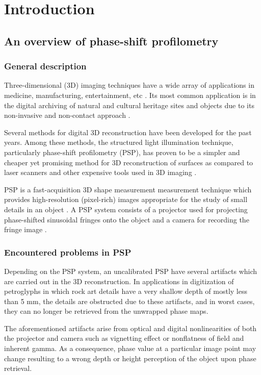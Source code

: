 \chapter{Introduction}

\section{An overview of phase-shift profilometry}
\subsection{General description}

Three-dimensional (3D) imaging techniques have a wide array of applications in medicine, manufacturing, entertainment, etc \cite{}. 
Its most common application is in the digital archiving of natural and cultural heritage sites and objects due to its non-invasive and non-contact approach \cite{Simon2013}. 

Several methods for digital 3D reconstruction have been developed for the past years. Among these methods, the structured light illumination technique, particularly phase-shift profilometry (PSP), has proven to be a simpler and cheaper yet promising method for 3D reconstruction of surfaces as compared to laser scanners and other expensive tools used in 3D imaging \cite{Zhang2002, Chrova200x}. 

PSP is a fast-acquisition 3D shape measurement measurement technique which provides high-resolution (pixel-rich) images appropriate for the study of small details in an object \cite{}. 
A PSP system consists of a projector used for projecting phase-shifted sinusoidal fringes onto the object and a camera for recording the fringe image \cite{}.

\subsection{Encountered problems in PSP}

Depending on the PSP system, an uncalibrated PSP have several artifacts which are carried out in the 3D reconstruction. 
In applications in digitization of petroglyphs in which rock art details have a very shallow depth of mostly less than 5 mm, the details are obstructed due to these artifacts, and in worst cases, they can no longer be retrieved from the unwrapped phase maps.

The aforementioned artifacts arise from optical and digital nonlinearities of both the projector and camera such as vignetting effect or nonflatness of field and inherent gamma. 
As a consequence, phase value at a particular image point may change resulting to a wrong depth or height perception of
the object upon phase retrieval.

